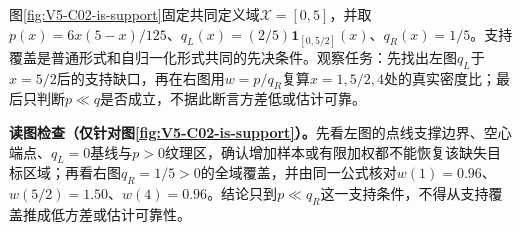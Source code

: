 \documentclass[UTF8,a4paper,11pt,openany]{ctexbook}
\begin{document}
\setcounter{page}{579}
\setcounter{chapter}{31}
\setcounter{figure}{5}
\pagestyle{headings}
图\ref{fig:V5-C02-is-support}固定共同定义域$\mathcal X=[0,5]$，并取$p(x)=6x(5-x)/125$、$q_L(x)=(2/5)\mathbf 1_{[0,5/2]}(x)$、$q_R(x)=1/5$。支持覆盖是普通形式和自归一化形式共同的先决条件。观察任务：先找出左图$q_L$于$x=5/2$后的支持缺口，再在右图用$w=p/q_R$复算$x=1,5/2,4$处的真实密度比；最后只判断$p\ll q$是否成立，不据此断言方差低或估计可靠。

\FloatBarrier
\noindent\textbf{读图检查（仅针对图\ref{fig:V5-C02-is-support}）。}先看左图的点线支撑边界、空心端点、$q_L=0$基线与$p>0$纹理区，确认增加样本或有限加权都不能恢复该缺失目标区域；再看右图$q_R=1/5>0$的全域覆盖，并由同一公式核对$w(1)=0.96$、$w(5/2)=1.50$、$w(4)=0.96$。结论只到$p\ll q_R$这一支持条件，不得从支持覆盖推成低方差或估计可靠性。
\end{document}
